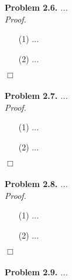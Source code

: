 \documentclass{article}
\begin{document}



\textbf{Problem 2.6.}
\emph{...} \\



\emph{Proof.}
\begin{enumerate}
\item[(1)]
  ...

\item[(2)]
  ...
\end{enumerate}
$\Box$ \\\\






\textbf{Problem 2.7.}
\emph{...} \\



\emph{Proof.}
\begin{enumerate}
\item[(1)]
  ...

\item[(2)]
  ...
\end{enumerate}
$\Box$ \\\\






\textbf{Problem 2.8.}
\emph{...} \\



\emph{Proof.}
\begin{enumerate}
\item[(1)]
  ...

\item[(2)]
  ...
\end{enumerate}
$\Box$ \\\\






\textbf{Problem 2.9.}
\emph{...} \\
\end{document}
